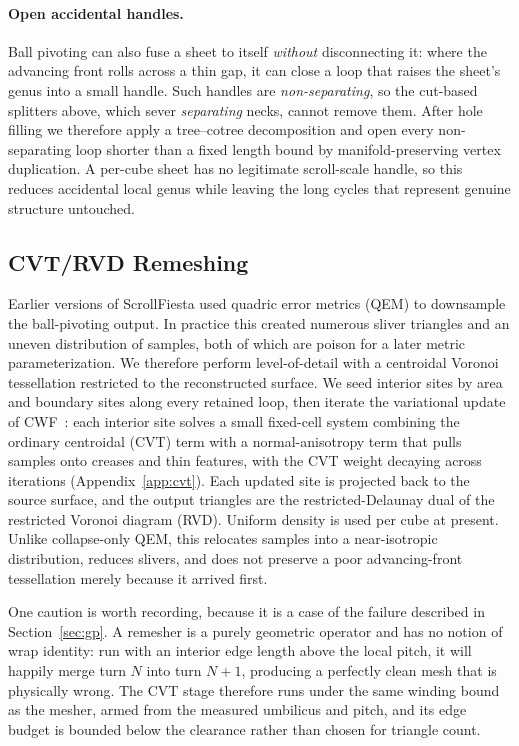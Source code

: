 \paragraph{Open accidental handles.} Ball pivoting can also fuse a sheet to itself \emph{without} disconnecting it: where the advancing front rolls across a thin gap, it can close a loop that raises the sheet's genus into a small handle. Such handles are \emph{non-separating}, so the cut-based splitters above, which sever \emph{separating} necks, cannot remove them. After hole filling we therefore apply a tree--cotree decomposition and open every non-separating loop shorter than a fixed length bound by manifold-preserving vertex duplication. A per-cube sheet has no legitimate scroll-scale handle, so this reduces accidental local genus while leaving the long cycles that represent genuine structure untouched.

\subsection{CVT/RVD Remeshing}
\label{sec:cvt}

Earlier versions of ScrollFiesta used quadric error metrics (QEM) to downsample the ball-pivoting output. In practice this created numerous sliver triangles and an uneven distribution of samples, both of which are poison for a later metric parameterization. We therefore perform level-of-detail with a centroidal Voronoi tessellation restricted to the reconstructed surface. We seed interior sites by area and boundary sites along every retained loop, then iterate the variational update of CWF~\cite{xu2024cwf}: each interior site solves a small fixed-cell system combining the ordinary centroidal (CVT) term with a normal-anisotropy term that pulls samples onto creases and thin features, with the CVT weight decaying across iterations (Appendix~\ref{app:cvt}). Each updated site is projected back to the source surface, and the output triangles are the restricted-Delaunay dual of the restricted Voronoi diagram (RVD). Uniform density is used per cube at present. Unlike collapse-only QEM, this relocates samples into a near-isotropic distribution, reduces slivers, and does not preserve a poor advancing-front tessellation merely because it arrived first.

One caution is worth recording, because it is a case of the failure described in Section~\ref{sec:gp}. A remesher is a purely geometric operator and has no notion of wrap identity: run with an interior edge length above the local pitch, it will happily merge turn $N$ into turn $N{+}1$, producing a perfectly clean mesh that is physically wrong. The CVT stage therefore runs under the same winding bound as the mesher, armed from the measured umbilicus and pitch, and its edge budget is bounded below the clearance rather than chosen for triangle count.

